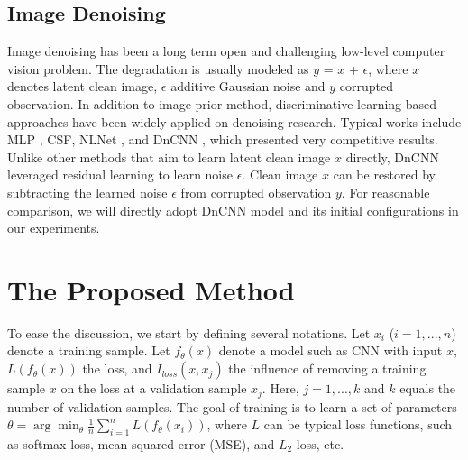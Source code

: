 \documentclass[10pt, conference, letterpaper]{IEEEtran}
\begin{document}
\subsection{Image Denoising}
\label{imgdenoising}
Image denoising has been a long term open and challenging low-level computer vision problem. The degradation is usually modeled as $y$ = $x$ + $\epsilon$, where $x$ denotes latent clean image, $\epsilon$ additive Gaussian noise and $y$ corrupted observation. In addition to image prior method, discriminative learning based approaches have been widely applied on denoising research. Typical works include MLP \cite{burger2012image}, CSF\cite{schmidt2014shrinkage}, NLNet \cite{lefkimmiatis2016non}, and DnCNN \cite{zhang2017beyond}, which presented very competitive results. Unlike other methods that aim to learn latent clean image $x$ directly, DnCNN leveraged residual learning to learn noise $\epsilon$. Clean image $x$ can be restored by subtracting the learned noise $\epsilon$ from corrupted observation $y$. For reasonable comparison, we will directly adopt DnCNN model and its initial configurations in our experiments.


\section{The Proposed Method}
\label{Method}

To ease the discussion, we start by defining several notations. Let $x_{i}$ ($i=1,...,n$) denote a training sample. Let $f_{\theta}(x)$ denote a model such as CNN with input $x$, $L(f_{\theta}(x))$ the loss, and $I_{loss}(x, x_{j})$ the influence of removing a training sample $x$ on the loss at a validation sample $x_{j}$. Here, $j=1,...,k$ and $k$ equals the number of validation samples. The goal of training is to learn a set of parameters $\theta = \arg\min_{\theta} \frac{1}{n} \sum_{i=1}^n L(f_{\theta}(x_{i}))$, where $L$ can be typical loss functions, such as softmax loss, mean squared error (MSE), and $L_2$ loss, etc.

\end{document}
